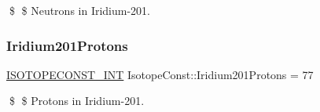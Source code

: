 \$ \$ Neutrons in Iridium-\/201. \mbox{\label{group___isotope_const-_iridium-_ir201_gab314005a736c5286b21f51cf2bbf3832}} 
\subsubsection{\texorpdfstring{Iridium201\+Protons}{Iridium201Protons}}
{\footnotesize\ttfamily \mbox{\hyperlink{group___isotope_const-_macros_ga5f18360b3e99483a35c32d789e62621c}{I\+S\+O\+T\+O\+P\+E\+C\+O\+N\+S\+T\+\_\+\+I\+NT}} Isotope\+Const\+::\+Iridium201\+Protons = 77}

\$ \$ Protons in Iridium-\/201. 